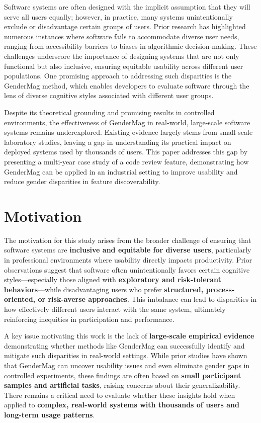 Software systems are often designed with the implicit assumption that they will serve all users equally; however, in practice, many systems unintentionally exclude or disadvantage certain groups of users. Prior research has highlighted numerous instances where software fails to accommodate diverse user needs, ranging from accessibility barriers to biases in algorithmic decision-making. These challenges underscore the importance of designing systems that are not only functional but also inclusive, ensuring equitable usability across different user populations. One promising approach to addressing such disparities is the GenderMag method, which enables developers to evaluate software through the lens of diverse cognitive styles associated with different user groups.

Despite its theoretical grounding and promising results in controlled environments, the effectiveness of GenderMag in real-world, large-scale software systems remains underexplored. Existing evidence largely stems from small-scale laboratory studies, leaving a gap in understanding its practical impact on deployed systems used by thousands of users. This paper addresses this gap by presenting a multi-year case study of a code review feature, demonstrating how GenderMag can be applied in an industrial setting to improve usability and reduce gender disparities in feature discoverability.

\section{Motivation}
The motivation for this study arises from the broader challenge of ensuring that software systems are \textbf{inclusive and equitable for diverse users}, particularly in professional environments where usability directly impacts productivity. Prior observations suggest that software often unintentionally favors certain cognitive styles—especially those aligned with \textbf{exploratory and risk-tolerant behaviors}—while disadvantaging users who prefer \textbf{structured, process-oriented, or risk-averse approaches}. This imbalance can lead to disparities in how effectively different users interact with the same system, ultimately reinforcing inequities in participation and performance.

A key issue motivating this work is the lack of \textbf{large-scale empirical evidence} demonstrating whether methods like GenderMag can successfully identify and mitigate such disparities in real-world settings. While prior studies have shown that GenderMag can uncover usability issues and even eliminate gender gaps in controlled experiments, these findings are often based on \textbf{small participant samples and artificial tasks}, raising concerns about their generalizability. There remains a critical need to evaluate whether these insights hold when applied to \textbf{complex, real-world systems with thousands of users and long-term usage patterns}.

